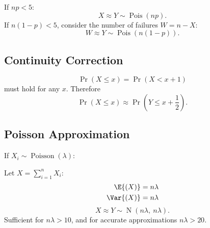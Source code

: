 \documentclass{article}
\begin{document}
\begin{minipage}{126.1962963mm}
\begin{multicols}{2}
        If \(np < 5\):
        \begin{equation*}
            X \approx Y \sim \operatorname{Pois}{\left( np \right)}.
        \end{equation*}
        If \(n\left( 1 - p \right) < 5\), consider the number of failures \(W = n - X\):
        \begin{equation*}
            W \approx Y \sim \operatorname{Pois}{\left( n\left( 1 - p \right) \right)}.
        \end{equation*}
        \subsection{Continuity Correction}
        \begin{equation*}
            \Pr{\left( X \leq x \right)} = \Pr{\left( X < x + 1 \right)}
        \end{equation*}
        must hold for any \(x\). Therefore
        \begin{equation*}
            \Pr{\left( X \leq x \right)} \approx \Pr{\left( Y \leq x + \frac{1}{2} \right)}.
        \end{equation*}
        \subsection{Poisson Approximation}
        If \(X_i \sim \operatorname{Poisson}{\left( \lambda \right)}\):
        
        Let \(X = \sum_{i = 1}^n X_i\):
        \begin{align*}
            \E{\left( X \right)}   & = n \lambda \\
            \Var{\left( X \right)} & = n \lambda
        \end{align*}
        \begin{equation*}
            X \approx Y \sim \operatorname{N}{\left( n\lambda,\: n\lambda \right)}.
        \end{equation*}
        Sufficient for \(n \lambda > 10\), and for accurate approximations \(n \lambda > 20\).
    \end{multicols}
\end{minipage}
\end{document}
